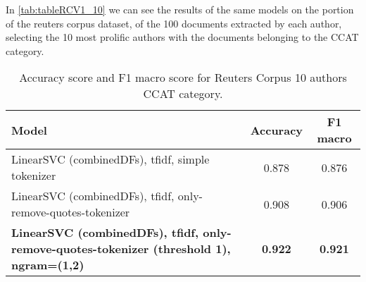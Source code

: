 In \autoref{tab:tableRCV1_10} we can see the results of the same models on the portion of the reuters corpus dataset, of the 100 documents extracted by each author, selecting the 10 most prolific authors with the documents belonging to the CCAT category.\\

\begin{table}[h!]
	\begin{center}  
		\caption[Reuters Corpus Results - 10 authors]{Accuracy score and F1 macro score for Reuters Corpus 10 authors CCAT category.} 
		\label{tab:tableRCV1_10}
		\begin{tabular}{| p{5 cm} | c | c |}
			\hline 
			Model & Accuracy & F1 macro \\
			\hline
			LinearSVC (combinedDFs), tfidf, simple tokenizer & 0.878 & 0.876 \\ \hline
			LinearSVC (combinedDFs), tfidf, only-remove-quotes-tokenizer & 0.908 & 0.906 \\ \hline
			\textbf{LinearSVC (combinedDFs), tfidf, only-remove-quotes-tokenizer (threshold 1),
			ngram=(1,2)} & \textbf{0.922} & \textbf{0.921} \\ \hline
		\end{tabular} 
	\end{center}
\end{table}

